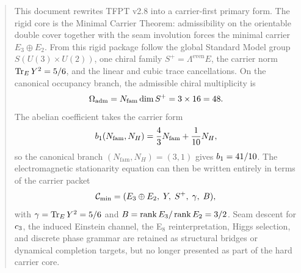 
\maketitle

\begin{abstract}
This document rewrites TFPT v2.8 into a carrier-first primary form. The rigid core is the Minimal Carrier Theorem: admissibility on the orientable double cover together with the seam involution forces the minimal carrier $E_3\oplus E_2$. From this rigid package follow the global Standard Model group $S(U(3)\times U(2))$, one chiral family $S^+=\Lambda^{\mathrm{even}}E$, the carrier norm $\tr_EY^2=5/6$, and the linear and cubic trace cancellations. On the canonical occupancy branch, the admissible chiral multiplicity is
\[
\Oadm = N_{\mathrm{fam}}\dim S^+ = 3\times16 = 48.
\]
The abelian coefficient takes the carrier form
\[
\bone(N_{\mathrm{fam}},N_H)=\frac43 N_{\mathrm{fam}}+\frac1{10}N_H,
\]
so the canonical branch $(N_{\mathrm{fam}},N_H)=(3,1)$ gives $\bone=41/10$. The electromagnetic stationarity equation can then be written entirely in terms of the carrier packet
\[
\Cmin=(E_3\oplus E_2,\;Y,\;S^+,\;\gamma,\;B),
\]
with $\gamma=\tr_EY^2=5/6$ and $B=\rank E_3/\rank E_2=3/2$. Seam descent for $\cthree$, the induced Einstein channel, the E$_8$ reinterpretation, Higgs selection, and discrete phase grammar are retained as structural bridges or dynamical completion targets, but no longer presented as part of the hard carrier core.
\end{abstract}

